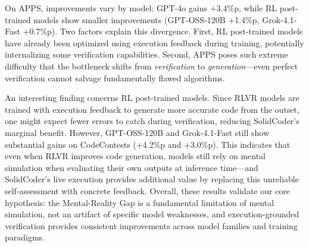 \documentclass[11pt]{article}
\begin{document}
On APPS, improvements vary by model: GPT-4o gains +3.4\%p, while RL post-trained models show smaller improvements (GPT-OSS-120B +1.4\%p, Grok-4.1-Fast +0.7\%p). Two factors explain this divergence. First, RL post-trained models have already been optimized using execution feedback during training, potentially internalizing some verification capabilities. Second, APPS poses such extreme difficulty that the bottleneck shifts from \textit{verification} to \textit{generation}---even perfect verification cannot salvage fundamentally flawed algorithms.

An interesting finding concerns RL post-trained models. Since RLVR models are trained with execution feedback to generate more accurate code from the outset, one might expect fewer errors to catch during verification, reducing SolidCoder's marginal benefit. However, GPT-OSS-120B and Grok-4.1-Fast still show substantial gains on CodeContests (+4.2\%p and +3.0\%p). This indicates that even when RLVR improves code generation, models still rely on mental simulation when evaluating their own outputs at inference time---and SolidCoder's live execution provides additional value by replacing this unreliable self-assessment with concrete feedback. Overall, these results validate our core hypothesis: the Mental-Reality Gap is a fundamental limitation of mental simulation, not an artifact of specific model weaknesses, and execution-grounded verification provides consistent improvements across model families and training paradigms.
\end{document}
